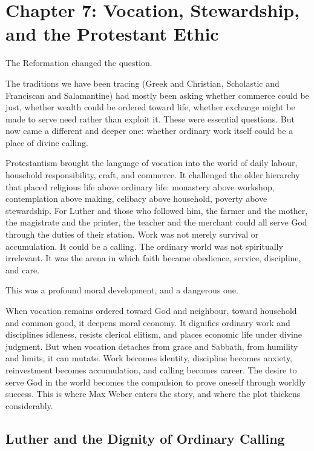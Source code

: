 \documentclass[11pt,a4paper,oneside]{book}
\begin{document}
\chapter*{Chapter 7: Vocation, Stewardship, and the Protestant Ethic}

The Reformation changed the question.

The traditions we have been tracing (Greek and Christian, Scholastic and Franciscan and Salamantine) had mostly been asking whether commerce could be just, whether wealth could be ordered toward life, whether exchange might be made to serve need rather than exploit it. These were essential questions. But now came a different and deeper one: whether ordinary work itself could be a place of divine calling.

Protestantism brought the language of vocation into the world of daily labour, household responsibility, craft, and commerce. It challenged the older hierarchy that placed religious life above ordinary life: monastery above workshop, contemplation above making, celibacy above household, poverty above stewardship. For Luther and those who followed him, the farmer and the mother, the magistrate and the printer, the teacher and the merchant could all serve God through the duties of their station. Work was not merely survival or accumulation. It could be a calling. The ordinary world was not spiritually irrelevant. It was the arena in which faith became obedience, service, discipline, and care.

This was a profound moral development, and a dangerous one.

When vocation remains ordered toward God and neighbour, toward household and common good, it deepens moral economy. It dignifies ordinary work and disciplines idleness, resists clerical elitism, and places economic life under divine judgment. But when vocation detaches from grace and Sabbath, from humility and limits, it can mutate. Work becomes identity, discipline becomes anxiety, reinvestment becomes accumulation, and calling becomes career. The desire to serve God in the world becomes the compulsion to prove oneself through worldly success. This is where Max Weber enters the story, and where the plot thickens considerably.

\section*{Luther and the Dignity of Ordinary Calling}
\end{document}
